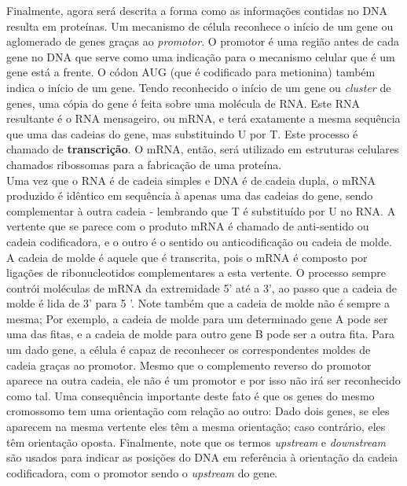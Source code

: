 \indent Finalmente, agora será descrita a forma como as informações contidas no DNA resulta em proteínas. Um mecanismo de célula reconhece o início de um gene ou aglomerado de genes graças ao \textit{promotor}. O promotor é uma região antes de cada gene no DNA que serve como uma indicação para o mecanismo celular que é um gene está a frente. O códon AUG (que é codificado para metionina) também indica o início de um gene. Tendo reconhecido o início de um gene ou \textit{cluster} de genes, uma cópia do gene é feita sobre uma molécula de RNA. Este RNA resultante é o RNA mensageiro, ou mRNA, e terá exatamente a mesma sequência que uma das cadeias do gene, mas substituindo U por T. Este processo é chamado de \textbf{transcrição}. O mRNA, então, será utilizado em estruturas celulares chamados ribossomas para a fabricação de uma proteína. \\

\indent Uma vez que o RNA é de cadeia simples e DNA é de cadeia dupla, o mRNA produzido é idêntico em sequência à apenas uma das cadeias do gene, sendo complementar à outra cadeia - lembrando que T é substituído por U no RNA. A vertente que se parece com o produto mRNA é chamado de anti-sentido ou cadeia codificadora, e o outro é o sentido ou anticodificação ou cadeia de molde. A cadeia de molde é aquele que é transcrita, pois o mRNA é composto por ligações de ribonucleotidos complementares a esta vertente. O processo sempre contrói moléculas de mRNA da extremidade 5' até a 3', ao passo que a cadeia de molde é lida de 3' para 5 '. Note também que a cadeia de molde não é sempre a mesma; Por exemplo, a cadeia de molde para um determinado gene A pode ser uma das fitas, e a cadeia de molde para outro gene B pode ser a outra fita. Para um dado gene, a célula é capaz de reconhecer os correspondentes moldes de cadeia graças ao promotor. Mesmo que o complemento reverso do promotor aparece na outra cadeia, ele não é um promotor e por isso não irá ser reconhecido como tal. Uma consequência importante deste fato é que os genes do mesmo cromossomo tem uma orientação com relação ao outro: Dado dois genes, se eles aparecem na mesma vertente eles têm a mesma orientação; caso contrário, eles têm orientação oposta. Finalmente, note que os termos \textit{upstream} e \textit{downstream} são usados para indicar as posições do DNA em referência à orientação da cadeia codificadora, com o promotor sendo o \textit{upstream} do gene. \\

